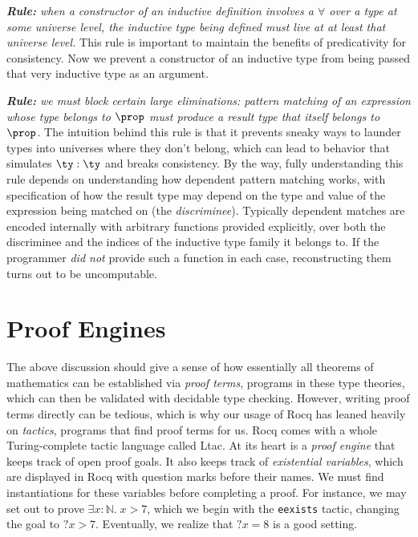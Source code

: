 \documentclass{amsbook}
\theoremstyle{definition}
\theoremstyle{remark}
\numberwithin{section}{chapter}
\numberwithin{equation}{chapter}
\begin{document}
\emph{\textbf{Rule:} when a constructor of an inductive definition involves a $\forall$ over a type at some universe level, the inductive type being defined must live at \emph{at least} that universe level.}
This rule is important to maintain the benefits of predicativity for consistency.
Now we prevent a constructor of an inductive type from being passed that very inductive type as an argument.

\emph{\textbf{Rule:} we must block certain \emph{large eliminations}: pattern matching of an expression whose type belongs to $\prop$ must produce a result type that itself belongs to $\prop$.}
The intuition behind this rule is that it prevents sneaky ways to launder types into universes where they don't belong, which can lead to behavior that simulates $\ty : \ty$ and breaks consistency.
By the way, fully understanding this rule depends on understanding how dependent pattern matching works, with specification of how the result type may depend on the type and value of the expression being matched on (the \emph{discriminee}).
Typically dependent matches are encoded internally with arbitrary functions provided explicitly, over both the discriminee and the indices of the inductive type family it belongs to.
If the programmer \emph{did not} provide such a function in each case, reconstructing them turns out to be uncomputable.

\section{Proof Engines}

The above discussion should give a sense of how essentially all theorems of mathematics can be established via \emph{proof terms}, programs in these type theories, which can then be validated with decidable type checking.
However, writing proof terms directly can be tedious, which is why our usage of Rocq has leaned heavily on \emph{tactics}, programs that find proof terms for us.
Rocq comes with a whole Turing-complete tactic language called Ltac.
At its heart is a \emph{proof engine} that keeps track of open proof goals.
It also keeps track of \emph{existential variables}, which are displayed in Rocq with question marks before their names.
We must find instantiations for these variables before completing a proof.
For instance, we may set out to prove $\exists x : \mathbb N. \; x > 7$, which we begin with the \texttt{eexists} tactic, changing the goal to $?x > 7$.
Eventually, we realize that $?x = 8$ is a good setting.
\end{document}
